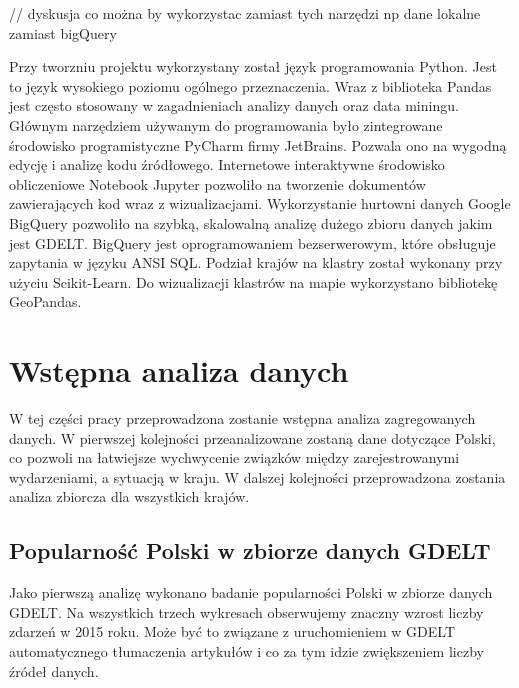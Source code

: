 \documentclass[11pt]{report}
\begin{document}
    // dyskusja co można by wykorzystac zamiast tych narzędzi np dane lokalne zamiast bigQuery

    Przy tworzniu projektu wykorzystany został język programowania Python.
    Jest to język wysokiego poziomu ogólnego przeznaczenia.
    Wraz z biblioteka Pandas jest często stosowany w zagadnieniach analizy danych oraz data miningu.
    Głównym narzędziem używanym do programowania było zintegrowane środowisko programistyczne PyCharm firmy JetBrains.
    Pozwala ono na wygodną edycję i analizę kodu źródłowego.
    Internetowe interaktywne środowisko obliczeniowe Notebook Jupyter pozwoliło na tworzenie dokumentów zawierających kod wraz z wizualizacjami.
    Wykorzystanie hurtowni danych Google BigQuery pozwoliło na szybką, skalowalną analizę dużego zbioru danych jakim jest GDELT.
    BigQuery jest oprogramowaniem bezserwerowym, które obsługuje zapytania w języku ANSI SQL.
    Podział krajów na klastry został wykonany przy użyciu Scikit-Learn.
    Do wizualizacji klastrów na mapie wykorzystano bibliotekę GeoPandas.


    \section{Wstępna analiza danych}
    W tej części pracy przeprowadzona zostanie wstępna analiza zagregowanych danych. W pierwszej kolejności przeanalizowane zostaną dane dotyczące Polski, co pozwoli na łatwiejsze wychwycenie związków między zarejestrowanymi wydarzeniami, a sytuacją w kraju.
    W dalszej kolejności przeprowadzona zostania analiza zbiorcza dla wszystkich krajów.

    \subsection{Popularność Polski w zbiorze danych GDELT}
    Jako pierwszą analizę wykonano badanie popularności Polski w zbiorze danych GDELT. Na wszystkich trzech wykresach obserwujemy znaczny wzrost liczby zdarzeń w 2015 roku. Może być to związane z uruchomieniem w GDELT automatycznego tłumaczenia artykułów i co za tym idzie zwiększeniem liczby źródeł danych.
\end{document}

